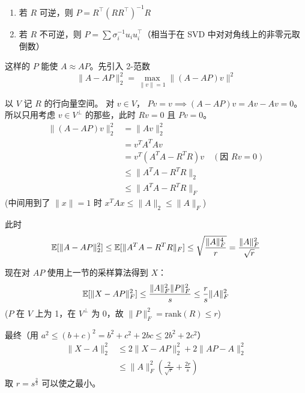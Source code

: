 \begin{enumerate}[noitemsep]
    \item 若 $R$ 可逆，则 $P=R^{\top}(RR^{\top})^{-1}R$
    \item 若 $R$ 不可逆，则 $P=\sum\sigma_{i}^{-1}u_{i}u_{i}^{\top}$（相当于在 SVD 中对对角线上的非零元取倒数）
\end{enumerate}

这样的 $P$ 能使 $A \approx AP$。先引入 2-范数
\[
    \|A-AP\|_{2}^{2} = \max_{\|v\|=1} \|(A-AP)v\|^{2}
\]

以 $V$ 记 $R$ 的行向量空间。
对 $v\in V$， $Pv=v \implies (A-AP)v=Av-Av=0$。
所以只用考虑 $v\in V^{\perp}$ 的那些，此时 $Rv=0$ 且 $Pv=0$。
\begin{align*}
    \|(A-AP)v\|_{2}^{2} &= \|Av\|_{2}^{2} \\
    &= v^{T}A^{T}A v \\
    &= v^{T}(A^{T}A-R^{T}R)v \quad (\text{因 } Rv=0) \\
    &\le \|A^{T}A-R^{T}R\|_{2} \\
    &\le \|A^{T}A-R^{T}R\|_{F}
\end{align*}
(中间用到了 $\|x\|=1$ 时 $x^T A x \le \|A\|_2 \le \|A\|_F$)

此时
\[
    \mathbb{E}[\|A-AP\|_{2}^{2}] \le \mathbb{E}[\|A^{T}A-R^{T}R\|_{F}] \le \sqrt{\frac{\|A\|_{F}^{4}}{r}} = \frac{\|A\|_{F}^{2}}{\sqrt{r}}
\]

现在对 $AP$ 使用上一节的采样算法得到 $X$：
\[
    \mathbb{E}[\|X-AP\|_{F}^{2}] \le \frac{\|A\|_{F}^{2}\|P\|_{F}^{2}}{s} \le \frac{r}{s}\|A\|_{F}^{2}
\]
($P$ 在 $V$ 上为 1，在 $V^{\perp}$ 为 0，故 $\|P\|_{F}^{2} = \text{rank}(R) \le r$)

最终（用 $a^2 \le (b + c)^2 = b^2 + c^2 + 2bc \le 2b^2 + 2c^2$）
\begin{align*}
    \|X-A\|_{2}^{2} &\le 2\|X-AP\|_{2}^{2} + 2\|AP-A\|_{2}^{2} \\
    &\le \|A\|_{F}^{2}\left(\frac{2}{\sqrt{r}}+\frac{2r}{s}\right)
\end{align*}
取 $r=s^{\frac{2}{3}}$ 可以使之最小。